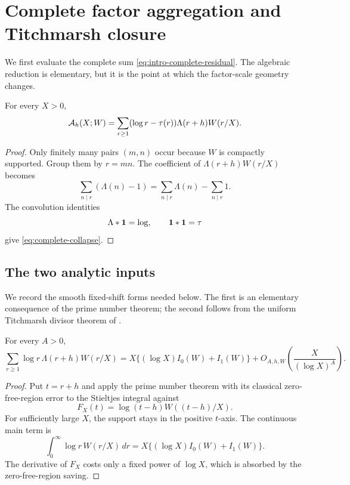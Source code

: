 \section{Complete factor aggregation and Titchmarsh closure}
\label{sec:zero-mellin-closure}

We first evaluate the complete sum \eqref{eq:intro-complete-residual}.
The algebraic reduction is elementary, but it is the point at which the
factor-scale geometry changes.

\begin{proposition}
\label{prop:zero-mode-collapse}
For every $X>0$,
\begin{equation}\label{eq:complete-collapse}
 \mathcal A_h(X;W)
 =\sum_{r\geq1}
   (\log r-\tau(r))\Lambda(r+h)W(r/X).
\end{equation}
\end{proposition}

\begin{proof}
Only finitely many pairs $(m,n)$ occur because $W$ is compactly supported.
Group them by $r=mn$.  The coefficient of
$\Lambda(r+h)W(r/X)$ becomes
\[
 \sum_{n\mid r}(\Lambda(n)-1)
 =\sum_{n\mid r}\Lambda(n)-\sum_{n\mid r}1.
\]
The convolution identities
\[
 \Lambda*\mathbf 1=\log,
 \qquad
 \mathbf 1*\mathbf 1=\tau
\]
give \eqref{eq:complete-collapse}.
\end{proof}

\subsection{The two analytic inputs}

We record the smooth fixed-shift forms needed below.  The first is an
elementary consequence of the prime number theorem; the second follows from
the uniform Titchmarsh divisor theorem of \citet{AssingBlomerLi2021}.

\begin{lemma}
\label{lem:shifted-log-prime}
For every $A>0$,
\begin{equation}\label{eq:shifted-log-prime}
 \sum_{r\geq1}\log r\,\Lambda(r+h)W(r/X)
 =X\{(\log X)I_0(W)+I_1(W)\}
 +O_{A,h,W}\!\left(\frac{X}{(\log X)^A}\right).
\end{equation}
\end{lemma}

\begin{proof}
Put $t=r+h$ and apply the prime number theorem with its classical
zero-free-region error to the Stieltjes integral against
\[
 F_X(t)=\log(t-h)W((t-h)/X).
\]
For sufficiently large $X$, the support stays in the positive $t$-axis.
The continuous main term is
\[
 \int_0^\infty\log r\,W(r/X)\,dr
 =X\{(\log X)I_0(W)+I_1(W)\}.
\]
The derivative of $F_X$ costs only a fixed power of $\log X$, which is
absorbed by the zero-free-region saving.
\end{proof}


